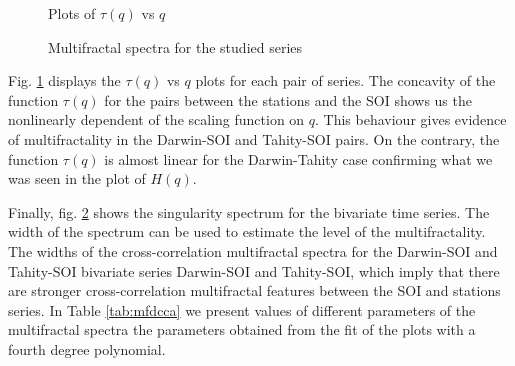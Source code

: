 \documentclass[onecolumn, preprint,aps,amsmath, amssymb, superscriptaddress]{revtex4}
\begin{document}
\begin{figure}
\caption{Plots of $\tau(q)$ vs $q$}
\label{fig:mfdcca_tau}
\end{figure}

\begin{figure}
\caption{Multifractal spectra for the studied series}
\label{fig:mfdcca_spectrum}
\end{figure}

Fig. \ref{fig:mfdcca_tau} displays the $\tau(q)$ vs $q$ plots for each pair of series. The concavity of the function $\tau(q)$ for the pairs between the stations and the SOI shows us the nonlinearly dependent of the scaling function on $q$. This behaviour gives evidence of multifractality in the Darwin-SOI and Tahity-SOI pairs. On the contrary, the function $\tau(q)$ is almost linear for the Darwin-Tahity case confirming what we was seen in the plot of $H(q)$.

Finally, fig. \ref{fig:mfdcca_spectrum} shows the singularity spectrum for the bivariate time series. The width of the spectrum can be used to estimate the level of the multifractality. The widths of the cross-correlation multifractal spectra for the Darwin-SOI and Tahity-SOI bivariate series Darwin-SOI and Tahity-SOI, which imply that there are stronger cross-correlation multifractal features between the SOI and stations series. In Table \ref{tab:mfdcca} we present values of different parameters of the multifractal spectra the parameters obtained from the fit of the plots with a fourth degree polynomial.
\end{document}
